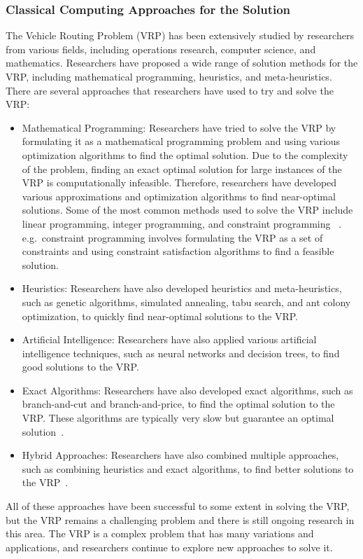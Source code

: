 \subsubsection{Classical Computing Approaches for the Solution}
The Vehicle Routing Problem (VRP) has been extensively studied by researchers from various fields, including operations research,
computer science, and mathematics. Researchers have proposed a wide range of solution methods for the VRP, including mathematical programming, heuristics,
and meta-heuristics.
There are several approaches that researchers have used to try and solve the VRP:
\begin{itemize}
    \item Mathematical Programming: Researchers have tried to solve the VRP by formulating it as a mathematical programming problem and using various optimization algorithms to find the optimal solution.
    Due to the complexity of the problem, finding an exact optimal solution for large instances of the VRP is computationally infeasible.
    Therefore, researchers have developed various approximations and optimization algorithms to find near-optimal solutions.
    Some of the most common methods used to solve the VRP include linear programming, integer programming, and constraint programming ~\cite{toth2002overview}.
    e.g.\ constraint programming involves formulating the VRP as a set of constraints and using constraint satisfaction algorithms to find a feasible solution.
    \item Heuristics: Researchers have also developed heuristics and meta-heuristics, such as genetic algorithms, simulated annealing, tabu search, and ant colony optimization, to quickly find near-optimal solutions to the VRP.
    \item Artificial Intelligence: Researchers have also applied various artificial intelligence techniques, such as neural networks and decision trees, to find good solutions to the VRP.
    \item Exact Algorithms: Researchers have also developed exact algorithms, such as branch-and-cut and branch-and-price, to find the optimal solution to the VRP. These algorithms are typically very slow but guarantee an optimal solution~\cite{laporte1987exact}.
    \item Hybrid Approaches: Researchers have also combined multiple approaches, such as combining heuristics and exact algorithms, to find better solutions to the VRP~\cite{hifi2014hybrid}.
\end{itemize}
All of these approaches have been successful to some extent in solving the VRP, but the VRP remains a challenging problem and there is still ongoing research in this area.
The VRP is a complex problem that has many variations and applications, and researchers continue to explore new approaches to solve it.

